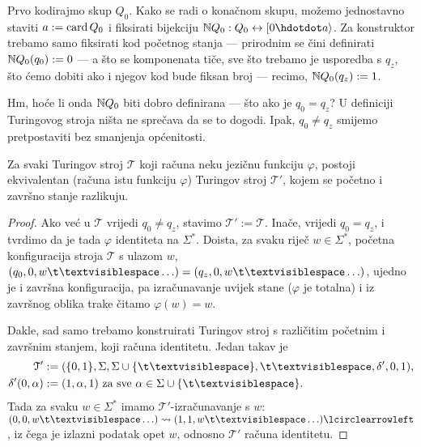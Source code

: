 
Prvo kodirajmo skup $Q_0$. Kako se radi o konačnom skupu, možemo jednostavno staviti $a:=\operatorname{card} Q_0$ i fiksirati bijekciju $\N Q_0:Q_0\leftrightarrow[0\dd a\rangle$. Za konstruktor trebamo samo fiksirati kod početnog stanja --- prirodnim se čini definirati ${\mathbb N} Q_0(q_0):=0$ --- a što se komponenata tiče, sve što trebamo je usporedba s $q_z$, što ćemo dobiti ako i njegov kod bude fiksan broj --- recimo, ${\mathbb N} Q_0(q_z):=1$.

Hm, hoće li onda ${\mathbb N} Q_0$ biti dobro definirana --- što ako je $q_0=q_z$? U definiciji Turingovog stroja ništa ne sprečava da se to dogodi. Ipak, $q_0\ne q_z$ smijemo pretpostaviti bez smanjenja općenitosti.

\begin{lema}[{name=[možemo pretpostaviti $q_0\ne q_z$]}]\label{lm:bsomp-q0neqz}
Za svaki Turingov stroj $\mathcal T$ koji računa neku jezičnu funkciju $\varphi$, postoji ekvivalentan (računa istu funkciju $\varphi$) Turingov stroj $\mathcal T'$, kojem se početno i završno stanje razlikuju.
\end{lema}
\begin{proof}
Ako već u $\mathcal T$ vrijedi $q_0\ne q_z$, stavimo $\mathcal T':=\mathcal T$. Inače, vrijedi $q_0=q_z$, i tvrdimo da je tada $\varphi$ identiteta na $\Sigma^*$. Doista, za svaku riječ $w\in\Sigma^*$, početna konfiguracija stroja $\mathcal T$ s ulazom $w$, $(q_0,0,w\bl\ldots)=(q_z,0,w\bl\ldots)$, ujedno je i završna konfiguracija, pa izračunavanje uvijek stane ($\varphi$ je totalna) i iz završnog oblika trake čitamo $\varphi(w)=w$.

Dakle, sad samo trebamo konstruirati Turingov stroj s različitim početnim i za\-vrš\-nim stanjem, koji računa identitetu. Jedan takav je
\begin{align}
    \mathcal T'&:=(\{0,1\},\Sigma,\Sigma\cup\{\bl\},\bl,\delta',0,1)\text,\\
    \delta'(0,\alpha)&:=(1,\alpha,1)\text{ za sve $\alpha\in\Sigma\cup\{\bl\}$.}
\end{align}
Tada za svaku $w\in\Sigma^*$ imamo $\mathcal T'$-izračunavanje s $w$: $(0,0,w\bl\ldots)\leadsto(1,1,w\bl\ldots)\lcirclearrowleft$, iz čega je izlazni podatak opet $w$, odnosno $\mathcal T'$ računa identitetu.
\end{proof}

